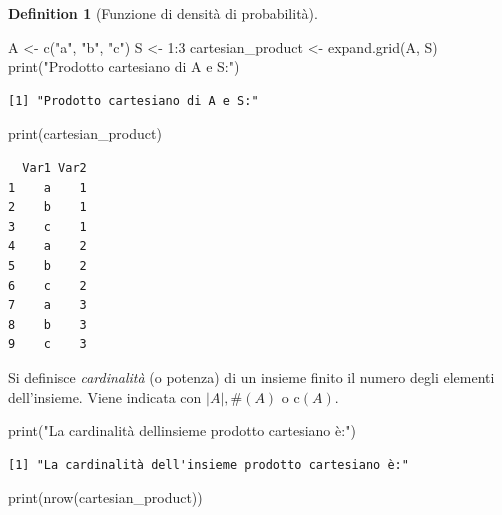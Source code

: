 \documentclass[
  letterpaper,
  DIV=11,
  numbers=noendperiod,
  oneside]{scrreprt}
\newenvironment{Shaded}{\begin{snugshade}}{\end{snugshade}}
\newcommand{\DecValTok}[1]{\textcolor[rgb]{0.68,0.00,0.00}{#1}}
\newcommand{\FunctionTok}[1]{\textcolor[rgb]{0.28,0.35,0.67}{#1}}
\newcommand{\NormalTok}[1]{\textcolor[rgb]{0.00,0.23,0.31}{#1}}
\newcommand{\OtherTok}[1]{\textcolor[rgb]{0.00,0.23,0.31}{#1}}
\newcommand{\SpecialCharTok}[1]{\textcolor[rgb]{0.37,0.37,0.37}{#1}}
\newcommand{\StringTok}[1]{\textcolor[rgb]{0.13,0.47,0.30}{#1}}
\theoremstyle{definition}
\theoremstyle{plain}
\theoremstyle{definition}
\newtheorem{definition}{Definition}[chapter]
\theoremstyle{remark}
\begin{document}
\begin{definition}[Funzione di densità di
probabilità]
\begin{Shaded}
\begin{Highlighting}[]
\NormalTok{A }\OtherTok{\textless{}{-}} \FunctionTok{c}\NormalTok{(}\StringTok{"a"}\NormalTok{, }\StringTok{"b"}\NormalTok{, }\StringTok{"c"}\NormalTok{)}
\NormalTok{S }\OtherTok{\textless{}{-}} \DecValTok{1}\SpecialCharTok{:}\DecValTok{3}
\NormalTok{cartesian\_product }\OtherTok{\textless{}{-}} \FunctionTok{expand.grid}\NormalTok{(A, S)}
\FunctionTok{print}\NormalTok{(}\StringTok{"Prodotto cartesiano di A e S:"}\NormalTok{)}
\end{Highlighting}
\end{Shaded}

\begin{verbatim}
[1] "Prodotto cartesiano di A e S:"
\end{verbatim}

\begin{Shaded}
\begin{Highlighting}[]
\FunctionTok{print}\NormalTok{(cartesian\_product)}
\end{Highlighting}
\end{Shaded}

\begin{verbatim}
  Var1 Var2
1    a    1
2    b    1
3    c    1
4    a    2
5    b    2
6    c    2
7    a    3
8    b    3
9    c    3
\end{verbatim}

Si definisce \emph{cardinalità} (o potenza) di un insieme finito il
numero degli elementi dell'insieme. Viene indicata con
\(\vert A\vert, \#(A)\) o \(\text{c}(A)\).

\begin{Shaded}
\begin{Highlighting}[]
\FunctionTok{print}\NormalTok{(}\StringTok{"La cardinalità dell\textquotesingle{}insieme prodotto cartesiano è:"}\NormalTok{)}
\end{Highlighting}
\end{Shaded}

\begin{verbatim}
[1] "La cardinalità dell'insieme prodotto cartesiano è:"
\end{verbatim}

\begin{Shaded}
\begin{Highlighting}[]
\FunctionTok{print}\NormalTok{(}\FunctionTok{nrow}\NormalTok{(cartesian\_product))}
\end{Highlighting}
\end{Shaded}


\end{definition}
\end{document}
